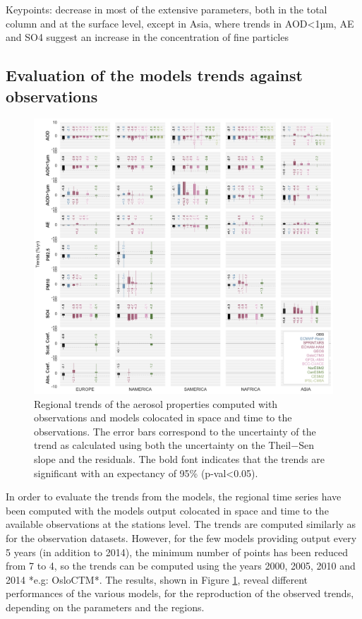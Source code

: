 \documentclass[journal abbreviation, manuscript]{copernicus}
\begin{document}
Keypoints: decrease in most of the extensive parameters, both in the total column and at the surface level, except in Asia, where trends in AOD<1µm, AE and SO4 suggest an increase in the concentration of fine particles

\subsection{Evaluation of the models trends against observations}

\begin{figure}[t]
 \includegraphics[width=16cm]{../scripts/figs/heatmaps/BARS.png}
 \caption{Regional trends of the aerosol properties computed with observations and models colocated in space and time to the observations. The error bars correspond to the uncertainty of the trend as calculated using both the uncertainty on the Theil−Sen slope and the residuals. The bold font indicates that the trends are significant with an expectancy of 95\% (p-val<0.05).}
 \label{fig:bars}
\end{figure}

In order to evaluate the trends from the models, the regional time series have been computed with the models output colocated in space and time to the available observations at the stations level. The trends are computed similarly as for the observation datasets. However, for the few models providing output every 5 years (in addition to 2014), the minimum number of points has been reduced from 7 to 4, so the trends can be computed using the years 2000, 2005, 2010 and 2014 *e.g: OsloCTM*. The results, shown in Figure \ref{fig:bars}, reveal different performances of the various models, for the reproduction of the observed trends, depending on the parameters and the regions.
\end{document}
